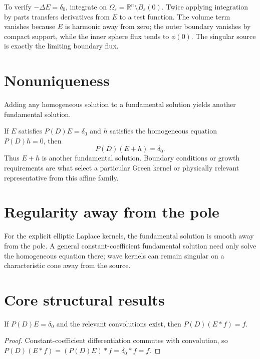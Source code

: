 \begin{example}\label{ex:iii24-expand-02}
To verify \(-\Delta E=\delta_0\), integrate on
\(\Omega_\varepsilon=\mathbb R^n\setminus B_\varepsilon(0)\). Twice applying
integration by parts transfers derivatives from \(E\) to a test function.
The volume term vanishes because \(E\) is harmonic away from zero; the outer
boundary vanishes by compact support, while the inner sphere flux tends to
\(\phi(0)\). The singular source is exactly the limiting boundary flux.
\end{example}
\section{Nonuniqueness}
Adding any homogeneous solution to a fundamental solution yields another fundamental solution.


\begin{example}\label{ex:iii24-expand-03}
If \(E\) satisfies \(P(D)E=\delta_0\) and \(h\) satisfies the homogeneous
equation \(P(D)h=0\), then
\[
P(D)(E+h)=\delta_0.
\]
Thus \(E+h\) is another fundamental solution. Boundary conditions or growth
requirements are what select a particular Green kernel or physically relevant
representative from this affine family.
\end{example}
\section{Regularity away from the pole}
For the explicit elliptic Laplace kernels, the fundamental solution is smooth away from the pole. A general constant-coefficient fundamental solution need only solve the homogeneous equation there; wave kernels can remain singular on a characteristic cone away from the source.

\section{Core structural results}

\begin{theorem}\label{thm:iii24-01}
If $P(D)E=\delta_0$ and the relevant convolutions exist, then $P(D)(E*f)=f$.
\begin{proof}
Constant-coefficient differentiation commutes with convolution, so $P(D)(E*f)=(P(D)E)*f=\delta_0*f=f$.
\end{proof}
\end{theorem}

